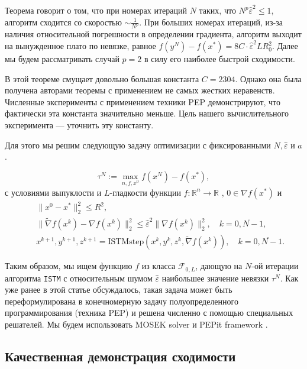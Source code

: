 \documentclass{article}
\newcommand{\R}{\mathbb{R}}
\begin{document}
Теорема говорит о том, что при номерах итераций $N$ таких, что $N^p \hat{\varepsilon}^2 \le 1$, алгоритм сходится со скоростью $\sim \frac{1}{N^p}$. При больших номерах итераций, из-за наличия относительной погрешности в определении градиента, алгоритм выходит на вынужденное плато по невязке, равное $f(y^N) - f(x^*) = 8C \cdot \hat{\varepsilon}^2 L R_0^2$. Далее мы будем рассматривать случай $p = 2$ в силу его наиболее быстрой сходимости.

В этой теореме смущает довольно большая константа $C = 2304$. Однако она была получена авторами теоремы с применением не самых жестких неравенств. Численные эксперименты с применением техники PEP демонстрируют, что фактически эта константа значительно меньше. Цель нашего вычислительного эксперимента --- уточнить эту константу.

Для этого мы решим следующую задачу оптимизации с фиксированными  $N, \hat{\varepsilon}$ и $a$.

\begin{equation}\label{eq:max_problem_intro}
 \tau^N := \max\limits_{n, f, x^0} f(x^N) - f(x^*),   
\end{equation}
с условиями выпуклости и $L$-гладкости функции $f:\R^n \rightarrow \R$ , $0 \in \nabla f(x^*)$ и 
\begin{eqnarray} 
    && \|x^0 - x^*\|^2_2 \leq R^2,  \\
    && \|\widetilde{\nabla} f(x^k) - \nabla f(x^k)\|^2_2 \leq \hat{\varepsilon}^2 \|\nabla f(x^k)\|^2_2, \quad k = \overline{0,  N-1}, \label{eq:pep_rel} \\
    && x^{k+1}, y^{k+1}, z^{k+1} = \text{ISTMstep}(x^{k}, y^k, z^k, \widetilde{\nabla} f(x^k)), \quad k = \overline{0,  N-1}.\label{eq:pep_istm}
\end{eqnarray}

Таким образом, мы ищем функцию $f$ из класса $\mathcal{F}_{0, L}$, дающую на $N$-ой итерации алгоритма \texttt{ISTM} с относительным шумом $\hat{\varepsilon}$ наибольшее значение невязки $\tau^N$. Как уже ранее в этой статье обсуждалось, такая задача может быть переформулирована в конечномерную задачу полуопределенного программирования (техника PEP) и решена численно с помощью специальных решателей. Мы будем использовать MOSEK solver \cite{aps2019mosek} и PEPit framework \cite{goujaud2022pepit}.

\subsection{Качественная демонстрация сходимости}
\end{document}
